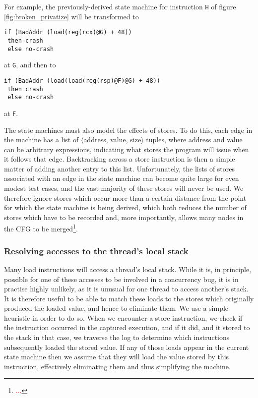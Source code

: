 \documentclass[10pt,twocolumn,preprint,natbib,authoryear]{sigplanconf}
\newcommand{\editorial}[1]{\textcolor{red}{\footnote{\textcolor{red}{#1}}}}
\begin{document}
For example, the previously-derived state machine for instruction
\verb|H| of figure \ref{fig:broken_privatize} will be transformed to

\begin{verbatim}
if (BadAddr (load(reg(rcx)@G) + 48))
 then crash
 else no-crash
\end{verbatim}

at \verb|G|, and then to

\begin{verbatim}
if (BadAddr (load(load(reg(rsp)@F)@G) + 48))
 then crash
 else no-crash
\end{verbatim}

at \verb|F|.

The state machines must also model the effects of stores.  To do this,
each edge in the machine has a list of $\langle{}$address, value,
size$\rangle{}$ tuples, where address and value can be arbitrary
expressions, indicating what stores the program will issue when it
follows that edge.  Backtracking across a store instruction is then a
simple matter of adding another entry to this list.  Unfortunately,
the lists of stores associated with an edge in the state machine can
become quite large for even modest test cases, and the vast majority
of these stores will never be used.  We therefore ignore stores which
occur more than a certain distance from the point for which the state
machine is being derived, which both reduces the number of stores
which have to be recorded and, more importantly, allows many nodes in
the CFG to be merged\editorial{...}.

\subsubsection{Resolving accesses to the thread's local stack}
\label{sect:resolvestack}

Many load instructions will access a thread's local stack.  While it
is, in principle, possible for one of these accesses to be involved in
a concurrency bug, it is in practise highly unlikely, as it is unusual
for one thread to access another's stack.  It is therefore useful to
be able to match these loads to the stores which originally produced
the loaded value, and hence to eliminate them.  We use a simple
heuristic in order to do so.  When we encounter a store instruction,
we check if the instruction occurred in the captured execution, and if
it did, and it stored to the stack in that case, we traverse the log
to determine which instructions subsequently loaded the stored value.
If any of those loads appear in the current state machine then we
assume that they will load the value stored by this instruction,
effectively eliminating them and thus simplifying the machine.
\end{document}

